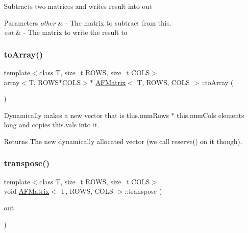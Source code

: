 Subtracts two matrices and writes result into {\ttfamily out} 
\begin{DoxyParams}{Parameters}
{\em other} & -\/ The matrix to subtract from {\ttfamily this}. \\
\hline
{\em out} & -\/ The matrix to write the result to \\
\hline
\end{DoxyParams}
\mbox{\label{class_a_f_matrix_a7e3659073ff6da5ffd02de48156decf5}} 
\subsubsection{\texorpdfstring{to\+Array()}{toArray()}}
{\footnotesize\ttfamily template$<$class T, size\+\_\+t R\+O\+WS, size\+\_\+t C\+O\+LS$>$ \\
array$<$T, R\+O\+WS$\ast$C\+O\+LS$>$$\ast$ \hyperlink{class_a_f_matrix}{A\+F\+Matrix}$<$ T, R\+O\+WS, C\+O\+LS $>$\+::to\+Array (\begin{DoxyParamCaption}{ }\end{DoxyParamCaption})\hspace{0.3cm}{\ttfamily [inline]}}

Dynamically makes a new vector that is {\ttfamily this.\+num\+Rows $\ast$ this.\+num\+Cols} elements long and copies {\ttfamily this.\+vals} into it. \begin{DoxyReturn}{Returns}
The new dynamically allocated vector (we call {\ttfamily reserve()} on it though). 
\end{DoxyReturn}
\mbox{\label{class_a_f_matrix_ae087fb4a064d256eac51513863b06fa2}} 
\subsubsection{\texorpdfstring{transpose()}{transpose()}\hspace{0.1cm}{\footnotesize\ttfamily [1/2]}}
{\footnotesize\ttfamily template$<$class T, size\+\_\+t R\+O\+WS, size\+\_\+t C\+O\+LS$>$ \\
void \hyperlink{class_a_f_matrix}{A\+F\+Matrix}$<$ T, R\+O\+WS, C\+O\+LS $>$\+::transpose (\begin{DoxyParamCaption}\item[{\hyperlink{class_a_f_matrix}{A\+F\+Matrix}$<$ T, C\+O\+LS, R\+O\+WS $>$ $\ast$}]{out }\end{DoxyParamCaption})\hspace{0.3cm}{\ttfamily [inline]}}

